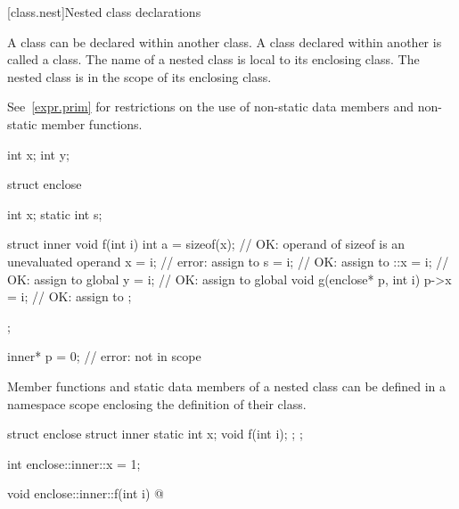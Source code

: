 [class.nest]{Nested class declarations}%
%
%

\pnum
A class can be declared within another class. A class declared within
another is called a  class. The name of a nested class
is local to its enclosing class.
%
The nested class is in the scope of its enclosing class.
\begin{note}
See~\ref{expr.prim} for restrictions on the use of non-static data
members and non-static member functions.
\end{note}

%
\begin{example}

\begin{codeblock}
int x;
int y;

struct enclose {
  int x;
  static int s;

  struct inner {
    void f(int i) {
      int a = sizeof(x);        // OK: operand of sizeof is an unevaluated operand
      x = i;                    // error: assign to 
      s = i;                    // OK: assign to 
      ::x = i;                  // OK: assign to global 
      y = i;                    // OK: assign to global 
    }
    void g(enclose* p, int i) {
      p->x = i;                 // OK: assign to 
    }
  };
};

inner* p = 0;                   // error:  not in scope
\end{codeblock}
\end{example}

\pnum
Member functions and static data members of a nested class can be
defined in a namespace scope enclosing the definition of their class.
%
\begin{example}

\begin{codeblock}
struct enclose {
  struct inner {
    static int x;
    void f(int i);
  };
};

int enclose::inner::x = 1;

void enclose::inner::f(int i) { @\commentellip@ }
\end{codeblock}
\end{example}

